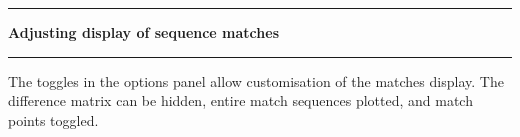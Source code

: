 \noindent\rule{\textwidth}{1pt}
\indent \textbf{Adjusting display of sequence matches}
\noindent\rule{\textwidth}{1pt}
\smallskip
\parbox{\textwidth}{The toggles in the options panel allow customisation of the matches display. The difference matrix can be hidden, entire match sequences plotted, and match points toggled.}
\smallskip
